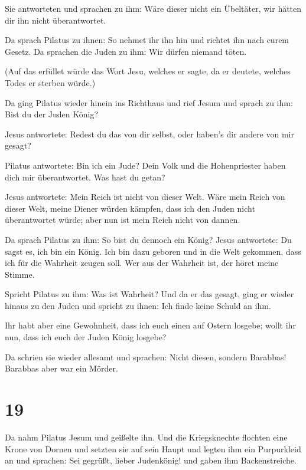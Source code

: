  Sie antworteten und sprachen zu ihm: Wäre dieser nicht
ein Übeltäter, wir hätten dir ihn nicht überantwortet.

 Da sprach Pilatus zu ihnen: So nehmet ihr ihn hin und
richtet ihn nach eurem Gesetz. Da sprachen die Juden zu ihm: Wir dürfen
niemand töten.

 (Auf das erfüllet würde das Wort Jesu, welches er sagte,
da er deutete, welches Todes er sterben würde.)

 Da ging Pilatus wieder hinein ins Richthaus und rief
Jesum und sprach zu ihm: Bist du der Juden König?

 Jesus antwortete: Redest du das von dir selbst, oder
haben's dir andere von mir gesagt?

 Pilatus antwortete: Bin ich ein Jude? Dein Volk und die
Hohenpriester haben dich mir überantwortet. Was hast du getan?

 Jesus antwortete: Mein Reich ist nicht von dieser Welt.
Wäre mein Reich von dieser Welt, meine Diener würden kämpfen, dass ich
den Juden nicht überantwortet würde; aber nun ist mein Reich nicht von
dannen.

 Da sprach Pilatus zu ihm: So bist du dennoch ein König?
Jesus antwortete: Du sagst es, ich bin ein König. Ich bin dazu geboren
und in die Welt gekommen, dass ich für die Wahrheit zeugen soll. Wer aus
der Wahrheit ist, der höret meine Stimme.

 Spricht Pilatus zu ihm: Was ist Wahrheit? Und da er das
gesagt, ging er wieder hinaus zu den Juden und spricht zu ihnen: Ich
finde keine Schuld an ihm.

 Ihr habt aber eine Gewohnheit, dass ich euch einen auf
Ostern losgebe; wollt ihr nun, dass ich euch der Juden König losgebe?

 Da schrien sie wieder allesamt und sprachen: Nicht
diesen, sondern Barabbas! Barabbas aber war ein Mörder.

\hypertarget{section-18}{%
\section{19}\label{section-18}}

 Da nahm Pilatus Jesum und geißelte ihn. 
Und die Kriegsknechte flochten eine Krone von Dornen und setzten sie auf
sein Haupt und legten ihm ein Purpurkleid an  und
sprachen: Sei gegrüßt, lieber Judenkönig! und gaben ihm Backenstreiche.

